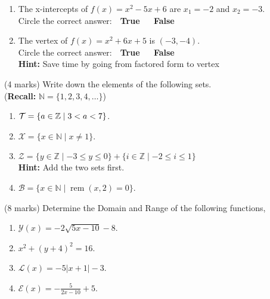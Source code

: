 \documentclass[12pt]{article} %
\begin{document}
\begin{qstn}
\begin{enumerate}
    \item The x-intercepts of $f(x) = x^2 -5x + 6$ are $x_1 = -2$ and $x_2 = -3$.\\
      Circle the correct answer: \,\, \textbf{True} \,\,\,\,\,\, \textbf{False}

    \item The vertex of $f(x) = x^2 + 6x + 5$ is $(-3,-4)$. \\
      Circle the correct answer: \,\, \textbf{True} \,\,\,\,\,\, \textbf{False}\\
      \textbf{Hint:} Save time by going from factored form to vertex\\
  \end{enumerate}
\end{qstn}

\newpage

\begin{qstn}
  (4 marks) Write down the elements of the following sets.\\
  (\textbf{Recall:} $\mathbb N = \{1,2,3,4,\dots\} $)
  \begin{enumerate}[label=(\alph*)]
    \item $\mathcal{T} = \{a \in \mathbb Z \mid 3 < a < 7\} $.
      \vspace*{5cm}

    \item $\mathcal{X} = \{x \in \mathbb N \mid x \neq 1 \} $.
      \vspace*{5cm}

    \item $\mathcal{Z} = \{y \in \mathbb Z \mid -3 \leq y \leq 0\} +  \{i \in \mathbb Z \mid -2 \leq i \leq 1\}$ \\
      \textbf{Hint:} Add the two sets first.
      \vspace*{5cm}

    \item $\mathcal{B} = \{x \in \mathbb N \mid \operatorname{rem}(x,2) = 0\} $.

  \end{enumerate}
\end{qstn}

\newpage

\begin{qstn}
  (8 marks) Determine the Domain and Range of the following functions,
  \begin{enumerate}[label=(\alph*)]
    \item $\mathcal{Y}(x) = -2\sqrt{5x - 10} - 8$.
      \vspace*{5cm}

    \item $x^2 + (y + 4)^2 = 16$.
      \vspace*{5cm}
    
    \item $\mathcal{L}(x) = -5\left|x + 1\right| - 3$.
      \vspace*{5cm}

    \item $\mathcal{E}(x) = -\frac{5}{2x - 10} + 5$.
  \end{enumerate}
\end{qstn}
\end{document}
